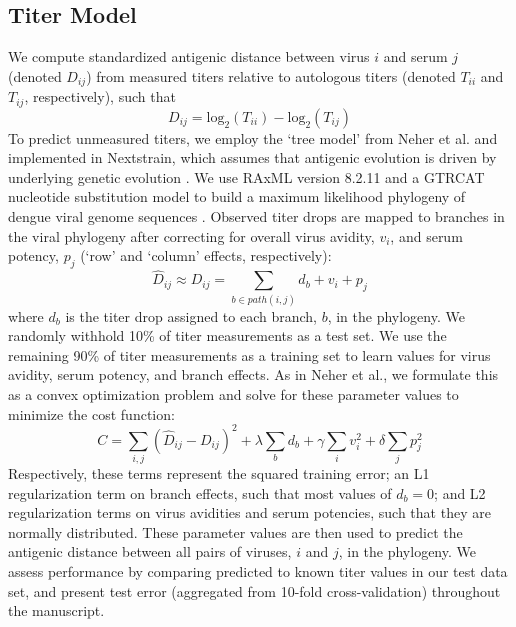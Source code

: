 \subsection*{Titer Model}
We compute standardized antigenic distance between virus $i$ and serum $j$ (denoted $D_{ij}$) from measured titers relative to autologous titers (denoted $T_{ii}$ and $T_{ij}$, respectively), such that
\begin{equation}
  \label{eq_titer_norm}
D_{ij} = \mathrm{log}_2(T_{ii}) - \mathrm{log}_2(T_{ij})
\end{equation}
To predict unmeasured titers, we employ the `tree model' from Neher et al. and implemented in Nextstrain, which assumes that antigenic evolution is driven by underlying genetic evolution \citep{hadfield2017nextstrain,neher2016prediction}.
We use RAxML version 8.2.11 and a GTRCAT nucleotide substitution model to build a maximum likelihood phylogeny of dengue viral genome sequences \citep{stamatakis2014raxml}.
Observed titer drops are mapped to branches in the viral phylogeny after correcting for overall virus avidity, $v_i$, and serum potency, $p_j$ (`row' and `column' effects, respectively):
\begin{equation}
  \label{eq_predicted_titers}
\hat{D}_{ij} \approx D_{ij} = \sum_{b \in path(i,j)} d_b + v_i + p_j
\end{equation}
where $d_b$ is the titer drop assigned to each branch, $b$, in the phylogeny.
We randomly withhold 10\% of titer measurements as a test set.
We use the remaining 90\% of titer measurements as a training set to learn values for virus avidity, serum potency, and branch effects.
As in Neher et al., we formulate this as a convex optimization problem and solve for these parameter values to minimize the cost function:
\begin{equation}
  \label{eq_cost_fn}
C = \sum_{i,j} (\hat{D}_{ij} - D_{ij})^2 + \lambda \sum_{b} d_b + \gamma \sum_{i} v_i^2 + \delta \sum_{j} p_j^2
\end{equation}
Respectively, these terms represent the squared training error; an L1 regularization term on branch effects, such that most values of $d_b = 0$; and L2 regularization terms on virus avidities and serum potencies, such that they are normally distributed.
These parameter values are then used to predict the antigenic distance between all pairs of viruses, $i$ and $j$, in the phylogeny.
We assess performance by comparing predicted to known titer values in our test data set, and present test error (aggregated from 10-fold cross-validation) throughout the manuscript.


